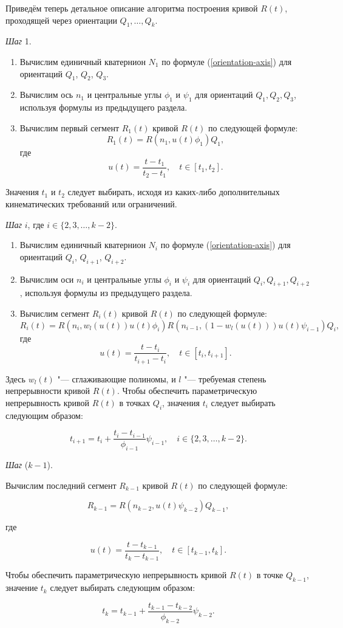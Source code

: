 Приведём теперь детальное описание алгоритма построения кривой $R(t)$, проходящей через ориентации $Q_1,\dots,Q_k$.

\bigskip
\textit{Шаг} 1.

\begin{enumerate}
\item Вычислим единичный кватернион $N_1$ по формуле (\ref{orientation-axis}) для ориентаций $Q_1$, $Q_2$, $Q_3$.
\item Вычислим ось $n_1$ и центральные углы $\phi_1$ и $\psi_1$ для ориентаций $Q_1,Q_2,Q_3$, используя формулы из
предыдущего раздела.
\item Вычислим первый сегмент $R_1(t)$ кривой $R(t)$ по следующей формуле:
$$
R_1(t)=R(n_1,u(t)\phi_1)Q_1,
$$
\noindent где
$$
u(t)=\frac{t-t_1}{t_2-t_1}, \quad t \in [t_1,t_2].
$$
\end{enumerate}

Значения $t_1$ и $t_2$ следует выбирать, исходя из каких-либо дополнительных кинематических требований или ограничений.

\bigskip
\textit{Шаг} $i$, где $i \in \{2,3,\dots,k-2\}$.

\begin{enumerate}
\item Вычислим единичный кватернион $N_i$ по формуле (\ref{orientation-axis}) для ориентаций $Q_i$, $Q_{i+1}$,
$Q_{i+2}$.
\item Вычислим оси $n_i$ и центральные углы $\phi_i$ и $\psi_i$ для ориентаций $Q_i, Q_{i+1}, Q_{i+2}$, используя
формулы из предыдущего раздела.
\item Вычислим сегмент $R_i(t)$ кривой $R(t)$ по следующей формуле:
$$
R_i(t)=R(n_i,w_l(u(t))u(t)\phi_i)R(n_{i-1},(1-w_l(u(t)))u(t)\psi_{i-1})Q_i,
$$
\noindent где
$$
u(t)=\frac{t-t_i}{t_{i+1}-t_i}, \quad t \in [t_i,t_{i+1}].
$$
\end{enumerate}

Здесь $w_l(t)$ "--- сглаживающие полиномы, и $l$ "--- требуемая степень непрерывности кривой $R(t)$. Чтобы обеспечить
параметрическую непрерывность кривой $R(t)$ в точках $Q_i$, значения $t_i$ следует выбирать следующим образом:

$$
t_{i+1}=t_i+\frac{t_i-t_{i-1}}{\phi_{i-1}}\psi_{i-1}, \quad i \in \{2,3,\dots,k-2\}.
$$

\bigskip
\textit{Шаг} ($k-1$).

Вычислим последний сегмент $R_{k-1}$ кривой $R(t)$ по следующей формуле:

$$
R_{k-1}=R(n_{k-2},u(t)\psi_{k-2})Q_{k-1},
$$

\noindent где

$$
u(t)=\frac{t-t_{k-1}}{t_k-t_{k-1}}, \quad t \in [t_{k-1},t_k].
$$

Чтобы обеспечить параметрическую непрерывность кривой $R(t)$ в точке $Q_{k-1}$, значение $t_k$ следует выбирать
следующим образом:

$$
t_k=t_{k-1}+\frac{t_{k-1}-t_{k-2}}{\phi_{k-2}}\psi_{k-2}.
$$
